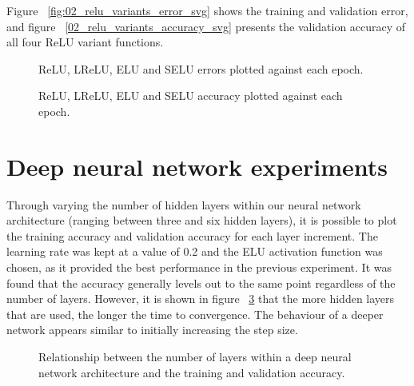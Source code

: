 \documentclass{article}
\begin{document}
Figure ~\ref{fig:02_relu_variants_error_svg} shows the training and validation error, and figure ~\ref{02_relu_variants_accuracy_svg} presents the validation accuracy of all four ReLU variant functions.

\begin{figure}[tb]
\vskip 5mm
\begin{center}
\centerline{}
\caption{ReLU, LReLU, ELU and SELU errors plotted against each epoch.}
\label{fig:relu-variants-error}
\end{center}
\vskip -5mm
\end{figure}

\begin{figure}[tb]
\vskip 5mm
\begin{center}
\centerline{}
\caption{ReLU, LReLU, ELU and SELU accuracy plotted against each epoch.}
\label{fig:relu-variants-accuracy}
\end{center}
\vskip -5mm
\end{figure}

\section{Deep neural network experiments}
\label{sec:dnnexpts}

Through varying the number of hidden layers within our neural network architecture (ranging between three and six hidden layers), it is possible to plot the training accuracy and validation accuracy for each layer increment. The learning rate was kept at a value of 0.2 and the ELU activation function was chosen, as it provided the best performance in the previous experiment. It was found that the accuracy generally levels out to the same point regardless of the number of layers. However, it is shown in figure ~\ref{fig:dnn-accuracy} that the more hidden layers that are used, the longer the time to convergence. The behaviour of a deeper network appears similar to initially increasing the step size.

\begin{figure}[tb]
\vskip 5mm
\begin{center}
\centerline{}
\caption{Relationship between the number of layers within a deep neural network architecture and the training and validation accuracy.}
\label{fig:dnn-accuracy}
\end{center}
\vskip -5mm
\end{figure}
\end{document}
